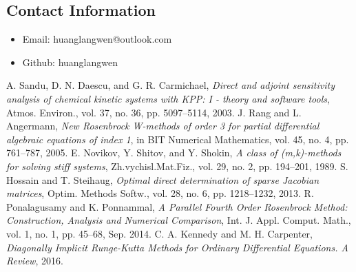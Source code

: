 \documentclass[a4paper]{article}
\begin{document}
\subsection{Contact Information}
\label{sec:orgc3beb77}
\begin{itemize}
\item Email: huanglangwen@outlook.com
\item Github: huanglangwen
\end{itemize}

\begin{thebibliography}{9}
	A. Sandu, D. N. Daescu, and G. R. Carmichael, 
	\emph{Direct and adjoint sensitivity analysis of chemical kinetic systems with KPP: I - theory and software tools},
	 Atmos. Environ., vol. 37, no. 36, pp. 5097–5114, 2003.
	J. Rang and L. Angermann, 
	\emph{New Rosenbrock W-methods of order 3 for partial differential algebraic equations of index 1},
	in BIT Numerical Mathematics,
	vol. 45, no. 4, pp. 761–787, 2005.
	E. Novikov, Y. Shitov, and Y. Shokin, 
	\emph{A class of (m,k)-methods for solving stiff systems},
	Zh.vychisl.Mat.Fiz., vol. 29, no. 2, pp. 194–201, 1989.
	S. Hossain and T. Steihaug, 
	\emph{Optimal direct determination of sparse Jacobian matrices},
	Optim. Methods Softw., vol. 28, no. 6, pp. 1218–1232, 2013.
	R. Ponalagusamy and K. Ponnammal,
	\emph{A Parallel Fourth Order Rosenbrock Method: Construction, Analysis and Numerical Comparison},
	Int. J. Appl. Comput. Math., vol. 1, no. 1, pp. 45–68, Sep. 2014.
	C. A. Kennedy and M. H. Carpenter,
	\emph{Diagonally Implicit Runge-Kutta Methods for Ordinary Differential Equations. A Review},
	2016.
\end{thebibliography}
\end{document}

